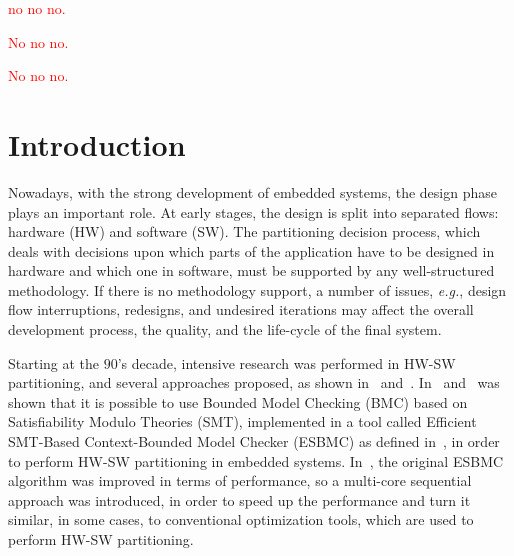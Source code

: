 \documentclass{doublecol-new}
\theoremstyle{TH}{
\newtheorem{lemma}{Lemma}
\newtheorem{theorem}[lemma]{Theorem}
\newtheorem{corrolary}[lemma]{Corrolary}
\newtheorem{conjecture}[lemma]{Conjecture}
\newtheorem{proposition}[lemma]{Proposition}
\newtheorem{claim}[lemma]{Claim}
\newtheorem{stheorem}[lemma]{Wrong Theorem}
\newtheorem{algorithm}{Algorithm}
}
\theoremstyle{THrm}{
\newtheorem{definition}{Definition}[section]
\newtheorem{question}{Question}[section]
\newtheorem{remark}{Remark}
\newtheorem{scheme}{Scheme}
}
\theoremstyle{THhit}{
\newtheorem{case}{Case}[section]
}
\begin{document}


\begin{bio}
\textcolor{red}{
no no no.}

\textcolor{red}{\noindent No no no.}

\textcolor{red}{\noindent No no no.}
\end{bio}

\maketitle
\clearpage

\section{Introduction}

Nowadays, with the strong development of embedded systems, the design phase plays an important role. At early stages, the design is split into separated flows: hardware (HW) and software (SW). The partitioning decision process, which deals with decisions upon which parts of the application have to be designed in hardware and which one in software, must be supported by any well-structured methodology. If there is no methodology support, a number of issues, {\it e.g.}, design flow interruptions, redesigns, and undesired iterations may affect the overall development process, the quality, and the life-cycle of the final system.

Starting at the $90$'s decade, intensive research was performed in HW-SW partitioning, and several approaches proposed, as shown in~\cite{Arato2003} and~\cite{Mann2007}. In~\cite{Trindade2015} and~\cite{Trindade2016} was shown that it is possible to use Bounded Model Checking (BMC) based on Satisfiability Modulo Theories (SMT), implemented in a tool called Efficient SMT-Based Context-Bounded Model Checker (ESBMC) as defined in~\cite{Cordeiro2012}, in order to perform HW-SW partitioning in embedded systems. In~\cite{Trindade2016}, the original ESBMC algorithm was improved in terms of performance, so a multi-core sequential approach was introduced, in order to speed up the performance and turn it similar, in some cases, to conventional optimization tools, which are used to perform HW-SW partitioning.
\end{document}
